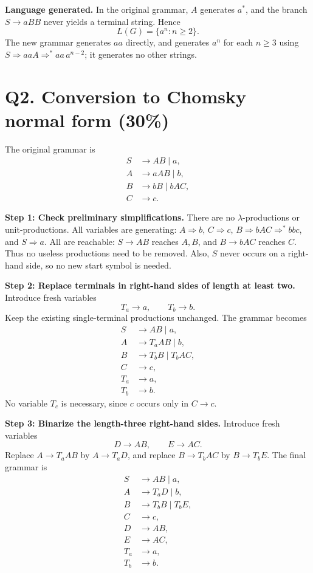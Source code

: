 \documentclass[11pt,a4paper]{article}
\newcommand{\derive}{\Rightarrow}
\newcommand{\derivestar}{\Rightarrow^{*}}
\begin{document}
\textbf{Language generated.}
In the original grammar, $A$ generates $a^{*}$, and the branch
$S\to aBB$ never yields a terminal string. Hence
\[
\boxed{L(G)=\{a^{n}:n\ge 2\}.}
\]
The new grammar generates $aa$ directly, and generates $a^n$ for each
$n\ge3$ using $S\derive aaA\derivestar aa\,a^{n-2}$; it generates no other strings.

\newpage
\section*{Q2. Conversion to Chomsky normal form (30\%)}
The original grammar is
\[
\begin{aligned}
S&\to AB\mid a,\\
A&\to aAB\mid b,\\
B&\to bB\mid bAC,\\
C&\to c.
\end{aligned}
\]

\textbf{Step 1: Check preliminary simplifications.}
There are no $\lambda$-productions or unit-productions.
All variables are generating: $A\derive b$, $C\derive c$,
$B\derive bAC\derivestar bbc$, and $S\derive a$.
All are reachable: $S\to AB$ reaches $A,B$, and $B\to bAC$ reaches $C$.
Thus no useless productions need to be removed.
Also, $S$ never occurs on a right-hand side, so no new start symbol is needed.

\textbf{Step 2: Replace terminals in right-hand sides of length at least two.}
Introduce fresh variables
\[
T_a\to a,\qquad T_b\to b.
\]
Keep the existing single-terminal productions unchanged. The grammar becomes
\[
\begin{aligned}
S&\to AB\mid a,\\
A&\to T_aAB\mid b,\\
B&\to T_bB\mid T_bAC,\\
C&\to c,\\
T_a&\to a,\\
T_b&\to b.
\end{aligned}
\]
No variable $T_c$ is necessary, since $c$ occurs only in $C\to c$.

\textbf{Step 3: Binarize the length-three right-hand sides.}
Introduce fresh variables
\[
D\to AB,\qquad E\to AC.
\]
Replace $A\to T_aAB$ by $A\to T_aD$, and replace $B\to T_bAC$
by $B\to T_bE$. The final grammar is
\[
\boxed{\begin{aligned}
S&\to AB\mid a,\\
A&\to T_aD\mid b,\\
B&\to T_bB\mid T_bE,\\
C&\to c,\\
D&\to AB,\\
E&\to AC,\\
T_a&\to a,\\
T_b&\to b.
\end{aligned}}
\]
\end{document}
